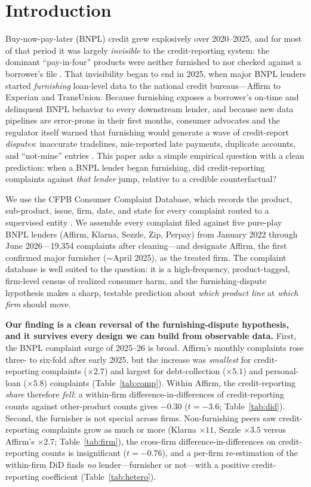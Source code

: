 \documentclass[12pt]{article}
\begin{document}
\newpage
\section{Introduction}
Buy-now-pay-later (BNPL) credit grew explosively over 2020--2025, and for most of that period
it was largely \emph{invisible} to the credit-reporting system: the dominant ``pay-in-four''
products were neither furnished to nor checked against a borrower's file
\citep{dimaggio2022,cfpb2022}. That invisibility began to end in 2025, when major BNPL lenders
started \emph{furnishing} loan-level data to the national credit bureaus---Affirm to Experian
and TransUnion. Because furnishing exposes a borrower's on-time and delinquent BNPL behavior
to every downstream lender, and because new data pipelines are error-prone in their first
months, consumer advocates and the regulator itself warned that furnishing would generate a
wave of credit-report \emph{disputes}: inaccurate tradelines, mis-reported late payments,
duplicate accounts, and ``not-mine'' entries \citep{cfpb2024}. This paper asks a simple
empirical question with a clean prediction: when a BNPL lender began furnishing, did
credit-reporting complaints against \emph{that lender} jump, relative to a credible
counterfactual?

We use the CFPB Consumer Complaint Database, which records the product, sub-product, issue,
firm, date, and state for every complaint routed to a supervised entity \citep{begley2021}. We
assemble every complaint filed against five pure-play BNPL lenders (Affirm, Klarna, Sezzle,
Zip, Perpay) from January 2022 through June 2026---19{,}354 complaints after cleaning---and
designate Affirm, the first confirmed major furnisher ($\sim$April 2025), as the treated firm.
The complaint database is well suited to the question: it is a high-frequency, product-tagged,
firm-level census of realized consumer harm, and the furnishing-dispute hypothesis makes a
sharp, testable prediction about \emph{which product line} at \emph{which firm} should move.

\textbf{Our finding is a clean reversal of the furnishing-dispute hypothesis, and it survives
every design we can build from observable data.} First, the BNPL complaint surge of 2025--26
is broad. Affirm's monthly complaints rose three- to six-fold after early 2025, but the
increase was \emph{smallest} for credit-reporting complaints ($\times 2.7$) and largest for
debt-collection ($\times 5.1$) and personal-loan ($\times 5.8$) complaints
(Table~\ref{tab:comp}). Within Affirm, the credit-reporting \emph{share} therefore \emph{fell}:
a within-firm difference-in-differences of credit-reporting counts against other-product counts
gives $-0.30$ ($t=-3.6$; Table~\ref{tab:did}). Second, the furnisher is not special across
firms. Non-furnishing peers saw credit-reporting complaints grow as much or more (Klarna
$\times 11$, Sezzle $\times 3.5$ versus Affirm's $\times 2.7$; Table~\ref{tab:firm}), the
cross-firm difference-in-differences on credit-reporting counts is insignificant ($t=-0.76$),
and a per-firm re-estimation of the within-firm DiD finds \emph{no} lender---furnisher or
not---with a positive credit-reporting coefficient (Table~\ref{tab:hetero}).
\end{document}
